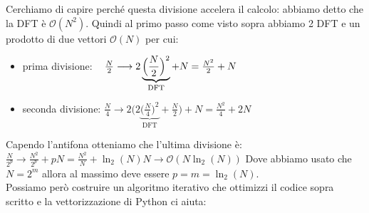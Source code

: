 \documentclass[10pt,a4paper]{article}
\begin{document}
Cerchiamo di capire perché questa divisione accelera il calcolo: abbiamo detto che la DFT è $\mathcal{O}(N^2)$. Quindi al primo passo come visto sopra abbiamo 2 DFT e un prodotto di due vettori $\mathcal{O}(N)$ per cui: 
\begin{itemize}
\item prima divisione: $ \hspace{3 mm} \frac{N}{2} \longrightarrow 2 \underbrace{ \Big( \frac{N}{2} \Big)^2}_{\text{DFT}} + N = \frac{N^2}{2} + N$
\item seconda divisione: $\frac{N}{4} \longrightarrow 2 \Big( 2 \underbrace{\Big( \frac{N}{4}\Big)^2}_{\text{DFT}} + \frac{N}{2} \Big) + N = \frac{N^2}{4} + 2N$ \\
\end{itemize}
Capendo l'antifona otteniamo che l'ultima divisione è: $\frac{N}{2^p} \longrightarrow \frac{N^2}{2^p} + pN = \frac{N^2}{N} + \ln_2(N) N \longrightarrow \mathcal{O}(N \ln_2 (N))$
Dove abbiamo usato che $N=2^m$ allora al massimo deve essere $p=m=\ln_2(N)$.\\
Possiamo però costruire un algoritmo iterativo che ottimizzi il codice sopra scritto e la vettorizzazione di Python ci aiuta:
\end{document}
